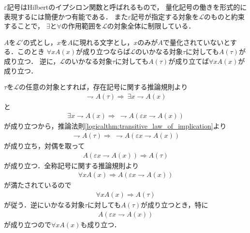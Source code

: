 	$\varepsilon$記号はHilbertのイプシロン関数と呼ばれるもので，
	量化記号の働きを形式的に表現するには簡便かつ有能である．
	また$\varepsilon$記号が指定する対象を$\mathcal{L}$のものと約束することで，
	$\exists$と$\forall$の作用範囲を$\mathcal{L}$の対象全体に制限している．
	
	\begin{screen}
		\begin{logicalthm}[全称記号と任意性]\label{logicalthm:fundamental_law_of_universal_quantifier}
			$A$を$\mathcal{L}'$の式とし，$x$を$A$に現れる文字とし，$x$のみが$A$で量化されていないとする．このとき
			$\forall x A(x)$が成り立つならば$\mathcal{L}$のいかなる対象$\tau$に対しても$ A(\tau)$が成り立つ．
			逆に，$\mathcal{L}$のいかなる対象$\tau$に対しても$A(\tau)$が成り立てば$\forall x A(x)$が成り立つ．
		\end{logicalthm}
	\end{screen}
	
	\begin{prf}
		$\tau$を$\mathcal{L}$の任意の対象とすれば，存在記号に関する推論規則より
		\begin{align}
			\rightharpoondown A(\tau) \Longrightarrow\ \exists x \rightharpoondown A(x)
		\end{align}
		と
		\begin{align}
			\exists x \rightharpoondown A(x) \Longrightarrow\ \rightharpoondown A
			\left( \varepsilon x \rightharpoondown A(x) \right)
		\end{align}
		が成り立つから，推論法則\ref{logicalthm:transitive_law_of_implication}より
		\begin{align}
			\rightharpoondown A(\tau) \Longrightarrow\ \rightharpoondown A
			\left( \varepsilon x \rightharpoondown A(x) \right)
		\end{align}
		が成り立ち，対偶を取って
		\begin{align}
			A \left( \varepsilon x \rightharpoondown A(x) \right)
			\Longrightarrow A(\tau)
		\end{align}
		が成り立つ．全称記号に関する推論規則より
		\begin{align}
			\forall x A(x) \Longrightarrow A \left( \varepsilon x \rightharpoondown A(x) \right)
		\end{align}
		が満たされているので
		\begin{align}
			\forall x A(x) \Longrightarrow A(\tau)
		\end{align}
		が従う．逆にいかなる対象$\tau$に対しても$A(\tau)$が成り立つとき，特に
		\begin{align}
			A \left( \varepsilon x \rightharpoondown A(x) \right)
		\end{align}
		が成り立つので$\forall x A(x)$も成り立つ．
		\QED
	\end{prf}
	
